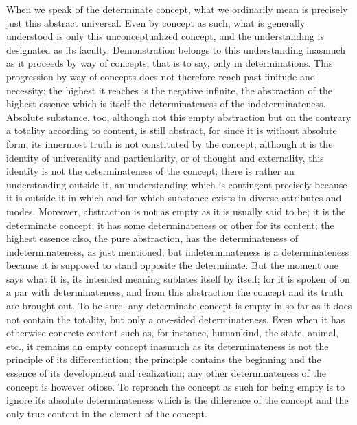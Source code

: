 When we speak of the determinate concept,
what we ordinarily mean is
precisely just this abstract universal.
Even by concept as such,
what is generally understood is
only this unconceptualized concept,
and the understanding is designated as its faculty.
Demonstration belongs to this understanding
inasmuch as it proceeds by way of concepts,
that is to say, only in determinations.
This progression by way of concepts does not therefore
reach past finitude and necessity;
the highest it reaches is the negative infinite,
the abstraction of the highest essence
which is itself the determinateness
of the indeterminateness.
Absolute substance, too, although not this empty abstraction
but on the contrary a totality according to content,
is still abstract, for since it is without absolute form,
its innermost truth is not constituted by the concept;
although it is the identity of universality and particularity,
or of thought and externality,
this identity is not the determinateness of the concept;
there is rather an understanding outside it,
an understanding which is contingent precisely
because it is outside it in which and for which
substance exists in diverse attributes and modes.
Moreover, abstraction is not as empty as
it is usually said to be;
it is the determinate concept;
it has some determinateness or other for its content;
the highest essence also, the pure abstraction,
has the determinateness of indeterminateness,
as just mentioned;
but indeterminateness is a determinateness
because it is supposed to stand opposite the determinate.
But the moment one says what it is,
its intended meaning sublates itself by itself;
for it is spoken of on a par with determinateness,
and from this abstraction the concept and its truth are brought out.
To be sure, any determinate concept is empty
in so far as it does not contain the totality,
but only a one-sided determinateness.
Even when it has otherwise concrete content
such as, for instance, humankind, the state, animal, etc.,
it remains an empty concept inasmuch as its determinateness is
not the principle of its differentiation;
the principle contains the beginning and the essence
of its development and realization;
any other determinateness of the concept is however otiose.
To reproach the concept as such for being empty is
to ignore its absolute determinateness
which is the difference of the concept
and the only true content in the element of the concept.

